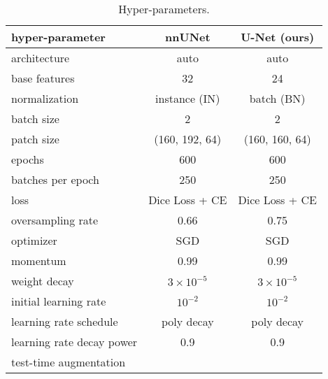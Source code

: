 

\begin{table}[h]
	\centering
	\caption{Hyper-parameters.}
	\label{tab:hyper}
		\begin{tabular}{lcc}
			\toprule 
			\textbf{hyper-parameter} & \textbf{nnUNet} & \textbf{U-Net (ours)}  \\ 
			\midrule
			architecture & auto & auto \\
			base features & 32 & 24 \\
			normalization & instance (IN) & batch (BN) \\
			batch size & 2 & 2 \\
			patch size & (160, 192, 64) & (160, 160, 64) \\
			epochs & 600 & 600 \\
			batches per epoch & 250 & 250 \\
			loss & Dice Loss + CE & Dice Loss + CE \\
			oversampling rate & 0.66 & 0.75 \\
			optimizer & SGD & SGD \\
			momentum & 0.99 & 0.99 \\
			weight decay & $3 \times 10^{-5}$  & $3 \times 10^{-5}$ \\
			initial learning rate & $10^{-2}$ & $10^{-2}$ \\
			learning rate schedule & poly decay & poly decay \\
			learning rate decay power & 0.9 & 0.9 \\
			test-time augmentation & \cmark & \xmark \\
			\bottomrule
	\end{tabular}%
\end{table}
